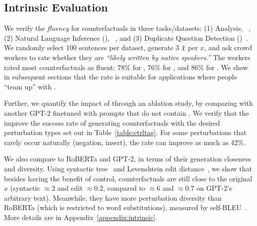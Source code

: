 \subsection{Intrinsic Evaluation}
\label{subsec:intrinsic}



We verify the \emph{fluency} for \sysname counterfactuals in three tasks/datasets: (1) \sst Analysis, \dsst~\cite{socher2013recursive},
(2) Natural Language Inference (\nli), \dnli~\cite{bowman-etal-2015-large}, and 
(3) Duplicate Question Detection (\dqqp)~\cite{wang2018glue}.
We randomly select 100 sentences per dataset, generate 3 \sysname $\hat{x}$ per $x$, and ask crowd workers to rate whether they are \emph{``likely written by native speakers.''}
The workers rated most counterfactuals as fluent: $78\%$ for \dsst, $76\%$ for \dqqp, and $86\%$ for \dnli.
We show in subsequent sections that the rate is suitable for applications where people ``team up'' with \sysname.

Further, we quantify the impact of \tagstrs through an ablation study, \ie by comparing \sysname with another GPT-2 finetuned with prompts that do not contain \tagstrshorts.
We verify that the \tagstrshorts improve the success rate of generating counterfactuals with the desired perturbation types set out in Table~\ref{table:ctrltag}.
For some perturbations that rarely occur naturally (\eg negation, insert), the rate can improve as much as 42\%.

We also compare \sysname to RoBERTa and GPT-2, in terms of their generation closeness and diversity.
Using syntactic tree~\cite{zhang1989simple} and Levenshtein edit distance~\cite{levenshtein1966binary}, we show that besides having the benefit of control, \sysname counterfactuals are still close to the original $x$ (syntactic ${\approx}2$ and edit ${\approx}0.2$, compared to ${\approx}6$ and ${\approx}0.7$ on GPT-2's arbitrary text).
Meanwhile, they have more perturbation diversity than RoBERTa (which is restricted to word substitutions), measured by self-BLEU~\cite{zhu2018texygen}.
More details are in Appendix~\ref{appendix:intrinsic}.
